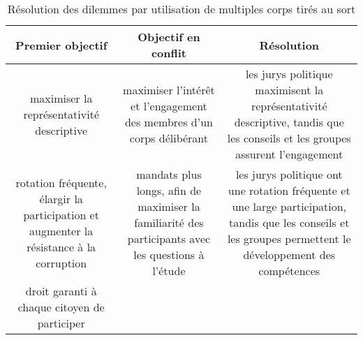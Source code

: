 \begin{table}[m]
  \caption{Résolution des dilemmes par utilisation de multiples
corps tirés au sort}\vspace{0.2cm}
  \begin{tabular}{*{3}{|c}|}
    \hline %
    \textbf{Premier objectif}
    &
    \textbf{Objectif en conflit}
    &
    \textbf{Résolution}
    \\  
    \hline %
    \begin{minipage}[c]{.33\linewidth}
          maximiser la représentativité descriptive
    \end{minipage}
    &
    \begin{minipage}[c]{.33\linewidth}
      maximiser l'intérêt et l'engagement des membres d'un corps
      délibérant
    \end{minipage}
    &
    \begin{minipage}[c]{.33\linewidth}
      les jurys politique maximisent la représentativité descriptive,
      tandis que les conseils et les groupes assurent l'engagement
    \end{minipage} 
    \\ 
    \hline %
    \begin{minipage}[c]{.33\linewidth}
      rotation fréquente, élargir la participation et augmenter la
      résistance à la corruption
    \end{minipage}
    &
    \begin{minipage}[c]{.33\linewidth}
      mandats plus longs, afin de 
      maximiser la familiarité des participants avec les questions à
      l'étude
    \end{minipage}
    &
    \begin{minipage}[c]{.33\linewidth}
      les jurys politique ont une rotation fréquente et une large
      participation, tandis que les conseils et les groupes permettent
      le développement des compétences
    \end{minipage} 
    \\
    \hline %
    \begin{minipage}[c]{.33\linewidth}
      droit garanti à chaque citoyen de participer
    \end{minipage}
    &
    \begin{minipage}[c]{.33\linewidth}

\end{minipage}
\end{tabular}
\end{table}
